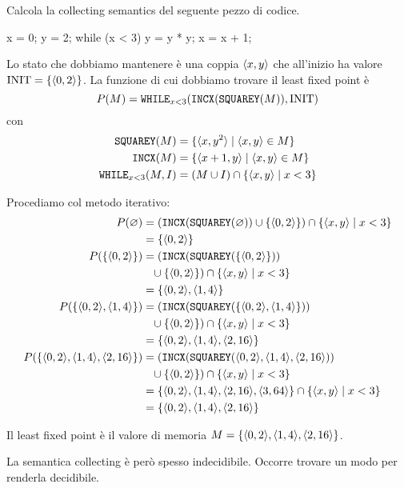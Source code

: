 \begin{example}\label{example:collecting}
Calcola la collecting semantics del seguente pezzo di codice.
\begin{javascriptcode}
x = 0;
y = 2;
while (x < 3) {
    y = y * y;
    x = x + 1;
}
\end{javascriptcode}
Lo stato che dobbiamo mantenere è una coppia $\langle x,y \rangle$ che all'inizio ha valore $\mathrm{INIT} = \{ \langle 0, 2 \rangle \}$. La funzione di cui dobbiamo trovare il least fixed point è
\[ P(M) = \texttt{WHILE}_{x<3}(\texttt{INCX}(\texttt{SQUAREY}(M)), \mathrm{INIT}) \]
con 
\begin{align*}
    \texttt{SQUAREY}(M) &= \{ \langle x,y^2 \rangle \mid \langle x,y \rangle \in M \} \\
    \texttt{INCX}(M) &= \{ \langle x+1,y \rangle \mid \langle x,y \rangle \in M \} \\
    \texttt{WHILE}_{x<3}(M, I) &= (M \cup I) \cap \{ \langle x,y \rangle \mid x < 3 \} 
\end{align*}

Procediamo col metodo iterativo:
\begin{align*}
    P(\varnothing) 
        &= (\texttt{INCX}(\texttt{SQUAREY}(\varnothing)) 
        \cup \{ \langle 0, 2 \rangle \} ) 
        \cap \{ \langle x,y \rangle \mid x < 3 \} \\
        &= \{ \langle 0, 2 \rangle \} \\
    P(\{ \langle 0, 2 \rangle \}) 
        &= (\texttt{INCX}(\texttt{SQUAREY}(\{ \langle 0, 2 \rangle \})) \\
        &\hphantom{=} \cup \{ \langle 0, 2 \rangle \} ) 
        \cap \{ \langle x,y \rangle \mid x < 3 \} \\
        &= \{ \langle 0, 2 \rangle,  \langle 1, 4 \rangle \} \\
    P(\{ \langle 0, 2 \rangle,  \langle 1, 4 \rangle \}) 
        &= (\texttt{INCX}(\texttt{SQUAREY}(\{ \langle 0, 2 \rangle,  \langle 1, 4 \rangle \})) \\
        &\hphantom{=} \cup \{ \langle 0, 2 \rangle \} ) 
        \cap \{ \langle x,y \rangle \mid x < 3 \} \\
        &= \{ \langle 0, 2 \rangle,  \langle 1, 4 \rangle, \langle 2, 16 \rangle \} \\
    P(\{ \langle 0, 2 \rangle,  \langle 1, 4 \rangle, \langle 2, 16 \rangle \} ) 
        &= (\texttt{INCX}(\texttt{SQUAREY}(\langle 0, 2 \rangle,  \langle 1, 4 \rangle, \langle 2, 16 \rangle)) \\
        &\hphantom{=} \cup \{ \langle 0, 2 \rangle \} ) 
        \cap \{ \langle x,y \rangle \mid x < 3 \} \\
        &= \{ \langle 0, 2 \rangle,  \langle 1, 4 \rangle, \langle 2, 16 \rangle, \langle 3, 64 \rangle \}
        \cap \{ \langle x,y \rangle \mid x < 3 \} \\
        &= \{ \langle 0, 2 \rangle,  \langle 1, 4 \rangle, \langle 2, 16 \rangle \}
\end{align*}

Il least fixed point è il valore di memoria $M = \{ \langle 0, 2 \rangle,  \langle 1, 4 \rangle, \langle 2, 16 \rangle \}$.
\end{example}

La semantica collecting è però spesso indecidibile. Occorre trovare un modo per renderla decidibile. 